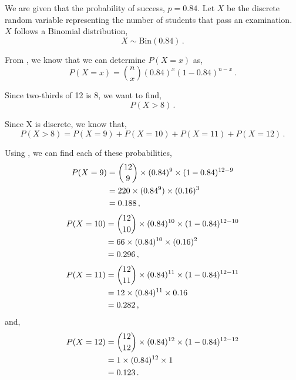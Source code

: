 \begin{subquestions}
\begin{subsubquestions}
\end{subsubquestions}
	
	
\subquestion

We are given that the probability of success, $p=0.84$. Let $X$ be the discrete random variable representing the number of students that pass an examination. $X$ follows a Binomial distribution,
\begin{equation}
	X \sim \text{Bin}(0.84) \,.
\end{equation} 

From , we know that we can determine $P(X=x)$ as,
\begin{equation}
	P(X = x) = { n \choose x} (0.84)^x (1-0.84)^{n-x} \,. \label{2011:q4:Bin1}
\end{equation}

Since two-thirds of 12 is 8, we want to find,
\begin{equation}
	P(X>8) \,.
\end{equation}

Since X is discrete, we know that,
\begin{equation}
	P(X > 8) = P(X=9)+P(X=10)+P(X=11)+P(X=12) \,. \label{2011:q4:Bin2}
\end{equation}

Using , we can find each of these probabilities,
\begin{align}
	P(X=9) & = { 12 \choose 9} \times (0.84)^9 \times (1-0.84)^{12-9} \nonumber \\
	       & = 220 \times (0.84^9) \times (0.16)^3 \nonumber \\
	       & = 0.188 \,,
\end{align}
\begin{align}
	P(X=10) & = { 12 \choose 10} \times (0.84)^{10} \times (1-0.84)^{12-10} \nonumber \\
	        & = 66 \times (0.84)^{10} \times (0.16)^2 \nonumber \\
	        & = 0.296 \,,
\end{align}
\begin{align}
	P(X=11) & = { 12 \choose 11} \times (0.84)^{11} \times (1-0.84)^{12-11} \nonumber \\
	        & = 12 \times (0.84)^{11} \times 0.16 \nonumber \\
	        & = 0.282 \,,
\end{align}
and,
\begin{align}
	P(X=12) & = { 12 \choose 12} \times (0.84)^{12} \times (1-0.84)^{12-12} \nonumber \\
	        & = 1 \times (0.84)^{12} \times 1 \nonumber \\
	        & = 0.123 \,. 
\end{align}


\end{subquestions}
